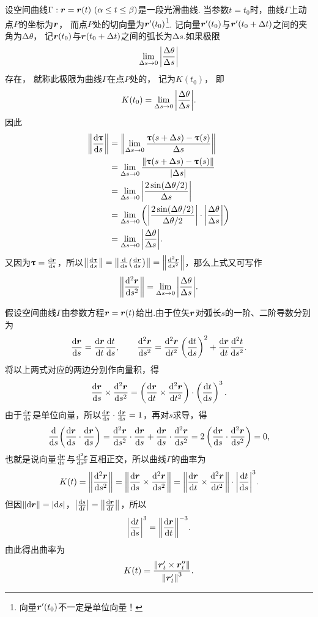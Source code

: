 设空间曲线\(\Gamma: \vb{r} = \vb{r}(t)\ (\alpha \leq t \leq \beta)\)是一段光滑曲线.
当参数\(t = t_0\)时，曲线\(\Gamma\)上动点\(P\)的坐标为\(\boldsymbol{r}\)，
而点\(P\)处的切向量为\(\boldsymbol{r}'(t_0)\)\footnote{向量\(\boldsymbol{r}'(t_0)\)不一定是单位向量！}.
记向量\(\boldsymbol{r}'(t_0)\)与\(\boldsymbol{r}'(t_0+\Delta t)\)之间的夹角为\(\increment\theta\)，
记\(\boldsymbol{r}(t_0)\)与\(\boldsymbol{r}(t_0+\Delta t)\)之间的弧长为\(\increment s\).如果极限\[
	\lim\limits_{\Delta s \to 0} \abs{ \frac{\Delta\theta}{\Delta s} }
\]存在，
就称此极限为曲线\(\Gamma\)在点\(P\)处的，
记为\(K(t_0)\)，
即\[
	K(t_0)
	= \lim\limits_{\Delta s \to 0} \abs{ \frac{\Delta\theta}{\Delta s} }.
\]
因此\begin{align*}
	\norm{ \dv{\boldsymbol{\uptau}}{s} }
	&= \norm{
			\lim\limits_{\Delta s \to 0}
				\frac{\boldsymbol{\uptau}(s+\Delta s) - \boldsymbol{\uptau}(s)}{\Delta s}
		} \\
	&= \lim\limits_{\Delta s \to 0}
		\frac{\norm{\boldsymbol{\uptau}(s+\Delta s) - \boldsymbol{\uptau}(s)}}{\abs{\Delta s}} \\
	&= \lim\limits_{\Delta s \to 0}
		\abs{ \frac{2 \sin(\Delta\theta / 2)}{\Delta s} } \\
	&= \lim\limits_{\Delta s \to 0}
		\left(
			\abs{ \frac{2 \sin(\Delta\theta / 2)}{\Delta\theta/2} }
			\cdot \abs{ \frac{\Delta\theta}{\Delta s} }
		\right) \\
	&= \lim\limits_{\Delta s \to 0}
		\abs{ \frac{\Delta\theta}{\Delta s} }.
\end{align*}
又因为\(\boldsymbol{\uptau} = \dv{\boldsymbol{r}}{s}\)，所以\(\norm{ \dv{\boldsymbol{\uptau}}{s} } = \norm{ \dv{s}( \dv{\boldsymbol{r}}{s} ) } = \norm{ \dv[2]{\boldsymbol{r}}{s} }\)，那么上式又可写作\begin{equation}
\norm{ \dv[2]{\boldsymbol{r}}{s} }
= \lim\limits_{\Delta s \to 0} \abs{ \frac{\Delta\theta}{\Delta s} }.
\end{equation}

假设空间曲线\(\Gamma\)由参数方程\(\boldsymbol{r} = \boldsymbol{r}(t)\)给出.由于位矢\(\boldsymbol{r}\)对弧长\(s\)的一阶、二阶导数分别为\[
\dv{\boldsymbol{r}}{s} = \dv{\boldsymbol{r}}{t} \dv{t}{s},
\qquad
\dv[2]{\boldsymbol{r}}{s} = \dv[2]{\boldsymbol{r}}{t} \left(\dv{t}{s}\right)^2 + \dv{\boldsymbol{r}}{t} \dv[2]{t}{s}.
\]将以上两式对应的两边分别作向量积，得\[
\dv{\boldsymbol{r}}{s} \times \dv[2]{\boldsymbol{r}}{s}
= \left(\dv{\boldsymbol{r}}{t} \times \dv[2]{\boldsymbol{r}}{t}\right) \cdot \left(\dv{t}{s}\right)^3.
\]由于\(\dv{\boldsymbol{r}}{s}\)是单位向量，所以\(\dv{\boldsymbol{r}}{s} \cdot \dv{\boldsymbol{r}}{s} = 1\)，再对\(s\)求导，得\[
\dv{s}( \dv{\boldsymbol{r}}{s} \cdot \dv{\boldsymbol{r}}{s} )
= \dv[2]{\boldsymbol{r}}{s} \cdot \dv{\boldsymbol{r}}{s} + \dv{\boldsymbol{r}}{s} \cdot \dv[2]{\boldsymbol{r}}{s}
= 2 \left( \dv{\boldsymbol{r}}{s} \cdot \dv[2]{\boldsymbol{r}}{s} \right)
= 0,
\]也就是说向量\(\dv{\boldsymbol{r}}{s}\)与\(\dv[2]{\boldsymbol{r}}{s}\)互相正交，所以曲线\(\Gamma\)的曲率为\[
K(t) = \norm{ \dv[2]{\boldsymbol{r}}{s} }
= \norm{ \dv{\boldsymbol{r}}{s} \times \dv[2]{\boldsymbol{r}}{s} }
= \norm{ \dv{\boldsymbol{r}}{t} \times \dv[2]{\boldsymbol{r}}{t} } \cdot \abs{ \dv{t}{s} }^3.
\]但因\(\norm{ \dd{\boldsymbol{r}} } = \abs{ \dd{s} }\)，\(\abs{ \dv{s}{t} } = \norm{ \dv{\boldsymbol{r}}{t} }\)，所以\[
\abs{ \dv{t}{s} }^3 = \norm{ \dv{\boldsymbol{r}}{t} }^{-3}.
\]由此得出曲率为\begin{equation}
K(t) = \frac{ \norm{ \boldsymbol{r}'_t \times \boldsymbol{r}''_t } }{ \norm{ \boldsymbol{r}'_t }^3 }.
\end{equation}

